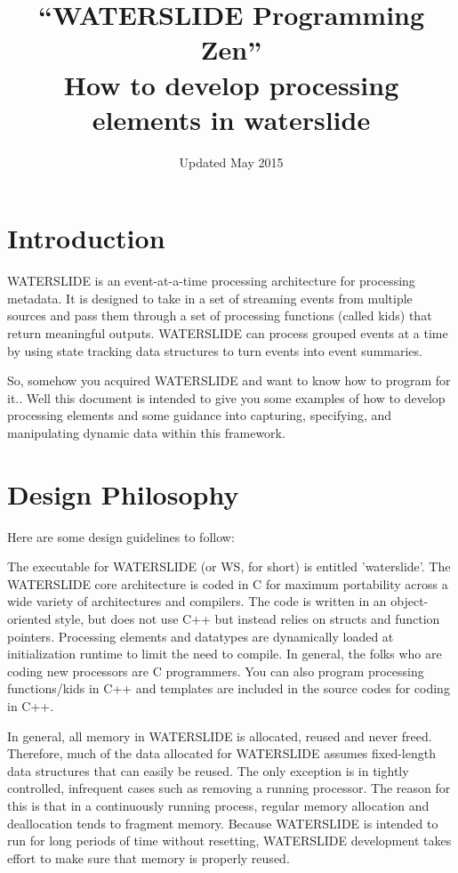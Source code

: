 \documentclass[11pt]{article}
\title{``WATERSLIDE Programming Zen''\\
How to develop processing elements in waterslide}
\date{Updated May 2015}
\begin{document}
\maketitle

\thispagestyle{fancy}

\pagestyle{fancy}
\fancyhf{}
\fancyhead[c]{}
\fancyfoot[c]{\thepage }
\fancyfoot[R]{}

\lstset{
    language=C,
    frame=single, 
    basicstyle=\footnotesize\ttfamily, 
    showstringspaces=false,
    breakatwhitespace=true,
    breaklines=true,
    commentstyle=\itshape
}

\section{Introduction}
WATERSLIDE is an event-at-a-time processing architecture for processing metadata.
It is designed to take in a set of streaming events from multiple sources and 
pass them through a set of processing functions (called kids) that return 
meaningful outputs.  WATERSLIDE can process grouped events at a time by using 
state tracking data structures to turn events into event summaries.  

So, somehow you acquired WATERSLIDE and want to know how to program for it.. 
Well this document is intended to 
give you some examples of how to develop processing elements and some guidance 
into capturing, specifying, and manipulating dynamic data within this 
framework.

\section{Design Philosophy}
Here are some design guidelines to follow:

The executable for WATERSLIDE (or WS, for short) is entitled 'waterslide'.
The WATERSLIDE core architecture is coded in C for maximum 
portability across a wide variety of architectures and compilers.  The code is
written in an object-oriented style, but does not use C++ but instead relies 
on structs and function pointers.  Processing elements and datatypes are 
dynamically loaded at initialization runtime to limit the need to compile.  
In general, the folks who are coding new processors are C programmers.  You can
also program processing functions/kids in C++ and templates are included in the
source codes for coding in C++.

In general, all memory in WATERSLIDE is allocated, reused and never freed.  
Therefore, much of the data allocated for WATERSLIDE assumes fixed-length data 
structures that can easily be reused.  The only exception is in tightly 
controlled, infrequent cases such as removing a running processor. The reason
for this is that in a continuously running process, regular memory allocation 
and deallocation tends to fragment memory. Because WATERSLIDE is intended to run
for long periods of time without resetting, WATERSLIDE development takes effort
to make sure that memory is properly reused.
\end{document}
